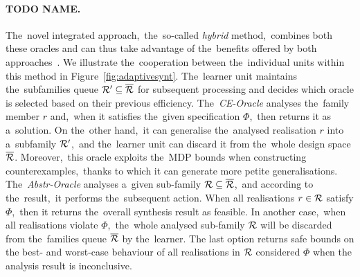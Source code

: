 \paragraph{TODO NAME.} The~novel integrated approach,~the~so-called \textit{hybrid} method,~combines both these oracles and can thus take advantage of the~benefits offered by both approaches~\cite{roman-DP,tacas21}.
We illustrate the~cooperation between the~individual units within this method in Figure~\ref{fig:adaptivesynt}.
The~learner unit maintains the~subfamilies queue $\mathcal{R}' \subseteq \overline{\mathcal{R}}$ for subsequent processing and decides which oracle is selected based on their previous efficiency.
The~\textit{CE-Oracle} analyses the~family member $r$ and,~when it satisfies the~given specification $\varPhi$,~then returns it as a~solution.
On the~other hand,~it can generalise the~analysed realisation $r$ into a~subfamily $\mathcal{R}'$,~and the~learner unit can discard it from the~whole design space $\overline{\mathcal{R}}$.
Moreover,~this oracle exploits the~MDP bounds when constructing counterexamples,~thanks to which it can generate more petite generalisations.
The~\textit{Abstr-Oracle} analyses a~given sub-family $\mathcal{R} \subseteq \overline{\mathcal{R}}$,~and according to the~result,~it performs the~subsequent action.
When all realisations $r \in \mathcal{R}$ satisfy $\varPhi$,~then it returns the~overall synthesis result as feasible.
In another case,~when all realisations violate $\varPhi$,~the~whole analysed sub-family $\mathcal{R}$ will be discarded from the~families queue $\overline{\mathcal{R}}$ by the~learner.
The last option returns safe bounds on the best- and worst-case behaviour of all realisations in $\mathcal{R}$ considered $\varPhi$ when the analysis result is inconclusive.

